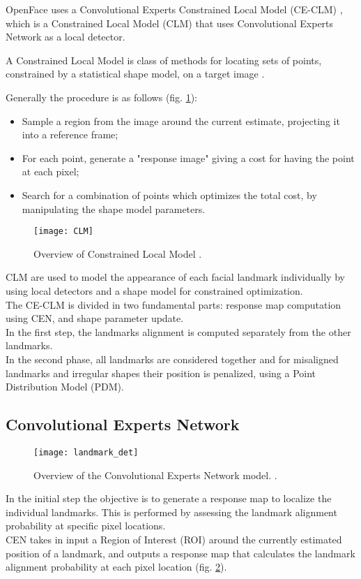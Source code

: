 OpenFace uses a Convolutional Experts Constrained Local Model (CE-CLM) \cite{Baltru2017}, which is a Constrained Local Model (CLM) that uses Convolutional Experts Network as a local detector. 

A Constrained Local Model is class of methods for locating sets of points, constrained by a statistical shape model, on a target image \cite{clm_cootes}.

Generally the procedure is as follows (fig. \ref{fig:CLM}):
\begin{itemize}[noitemsep]
	\item Sample a region from the image around the current estimate, projecting it into a reference frame;
	\item For each point, generate a "response image" giving a cost for having the point at each pixel;
	\item Search for a combination of points which optimizes the total cost, by manipulating the shape model parameters.
\end{itemize}

\begin{figure}[H]
	\centering
	\texttt{[image: CLM]}
	\caption{Overview of Constrained Local Model \cite{clm_cootes}.}
	\label{fig:CLM}
\end{figure}

CLM are used to model the appearance of each facial landmark individually by using local detectors and a shape model for constrained optimization. \\
The CE-CLM is divided in two fundamental parts: response map computation using CEN, and shape parameter update.\\
In the first step, the landmarks alignment is computed separately from the other landmarks. \\
In the second phase, all landmarks are considered together and for misaligned landmarks and irregular shapes their position is penalized, using a Point Distribution Model (PDM).

\subsection{Convolutional Experts Network}
\begin{figure}[H]
	\centering
	\texttt{[image: landmark\_det]}
	\caption{Overview of the Convolutional Experts Network model. \cite{Baltru2017}.}
	\label{fig:landmark_det}
\end{figure}
In the initial step the objective is to generate a response map to localize the individual landmarks. This is performed by assessing the landmark alignment probability at specific pixel locations. \\
CEN takes in input a Region of Interest (ROI) around the currently estimated position of a landmark, and outputs a response map that calculates the landmark alignment probability at each pixel location (fig. \ref{fig:landmark_det}).

